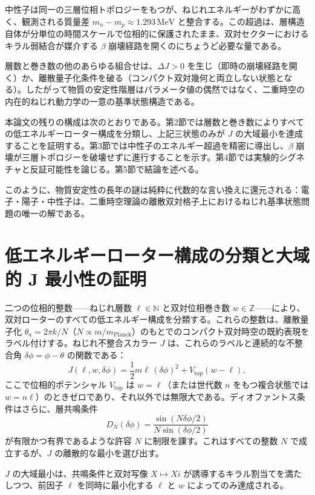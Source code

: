 \documentclass[dvipdfmx,a4paper]{article}
\begin{document}
中性子は同一の三層位相トポロジーをもつが、ねじれエネルギーがわずかに高く、観測される質量差 \(m_n-m_p\approx1.293\,\mathrm{MeV}\) と整合する。この超過は、層構造自体が分単位の時間スケールで位相的に保護されたまま、双対セクターにおけるキラル弱結合が媒介する \(\beta\) 崩壊経路を開くのにちょうど必要な量である。

層数と巻き数の他のあらゆる組合せは、\(\Delta J>0\) を生じ（即時の崩壊経路を開く）か、離散量子化条件を破る（コンパクト双対幾何と両立しない状態となる）。したがって物質の安定性階層はパラメータ値の偶然ではなく、二重時空の内在的ねじれ動力学の一意の基準状態構造である。

本論文の残りの構成は次のとおりである。第2節では層数と巻き数によりすべての低エネルギーローター構成を分類し、上記三状態のみが \(J\) の大域最小を達成することを証明する。第3節では中性子のエネルギー超過を精密に導出し、\(\beta\) 崩壊が三層トポロジーを破壊せずに進行することを示す。第4節では実験的シグネチャと反証可能性を論じる。第5節で結論を述べる。

このように、物質安定性の長年の謎は純粋に代数的な言い換えに還元される：電子・陽子・中性子は、二重時空理論の離散双対格子上におけるねじれ基準状態問題の唯一の解である。

\section{低エネルギーローター構成の分類と大域的 J 最小性の証明}

二つの位相的整数——ねじれ層数 \(\ell \in \mathbb{N}\) と双対位相巻き数 \(w \in \mathbb{Z}\)——により、双対ローターのすべての低エネルギー構成を分類する。これらの整数は、離散量子化 \(\theta_a = 2\pi k/N\)（\(N \propto m/m_\text{Planck}\)）のもとでのコンパクト双対時空の既約表現をラベル付けする。ねじれ不整合スカラー \(J\) は、これらのラベルと連続的な不整合角 \(\delta\phi = \phi - \theta\) の関数である：
\[
J(\ell,w,\delta\phi) = \frac12 m \ell \,(\delta\phi)^2 + V_\text{top}(w-\ell),
\]
ここで位相的ポテンシャル \(V_\text{top}\) は \(w=\ell\)（または世代数 \(n\) をもつ複合状態では \(w = n\ell\)）のときゼロであり、それ以外では無限大である。ディオファントス条件はさらに、層共鳴条件
\[
D_N(\delta\phi) = \frac{\sin(N\delta\phi/2)}{N\sin(\delta\phi/2)}
\]
が有限かつ有界であるような許容 \(N\) に制限を課す。これはすべての整数 \(N\) で成立するが、\(J\) の離散的な最小を選び出す。

\(J\) の大域最小は、共鳴条件と双対写像 \(X\mapsto Xi\) が誘導するキラル割当てを満たしつつ、前因子 \(\ell\) を同時に最小化する \(\ell\) と \(w\) によってのみ達成される。
\end{document}
